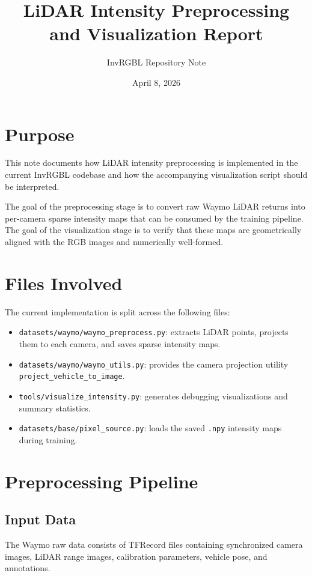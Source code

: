 \documentclass[11pt]{article}
\title{LiDAR Intensity Preprocessing and Visualization Report}
\author{InvRGBL Repository Note}
\date{April 8, 2026}
\begin{document}
\maketitle

\section{Purpose}
This note documents how LiDAR intensity preprocessing is implemented in the current InvRGBL codebase and how the accompanying visualization script should be interpreted.

The goal of the preprocessing stage is to convert raw Waymo LiDAR returns into per-camera sparse intensity maps that can be consumed by the training pipeline. The goal of the visualization stage is to verify that these maps are geometrically aligned with the RGB images and numerically well-formed.

\section{Files Involved}
The current implementation is split across the following files:

\begin{itemize}[leftmargin=1.5em]
    \item \texttt{datasets/waymo/waymo\_preprocess.py}: extracts LiDAR points, projects them to each camera, and saves sparse intensity maps.
    \item \texttt{datasets/waymo/waymo\_utils.py}: provides the camera projection utility \texttt{project\_vehicle\_to\_image}.
    \item \texttt{tools/visualize\_intensity.py}: generates debugging visualizations and summary statistics.
    \item \texttt{datasets/base/pixel\_source.py}: loads the saved \texttt{.npy} intensity maps during training.
\end{itemize}

\section{Preprocessing Pipeline}

\subsection{Input Data}
The Waymo raw data consists of TFRecord files containing synchronized camera images, LiDAR range images, calibration parameters, vehicle pose, and annotations.
\end{document}
